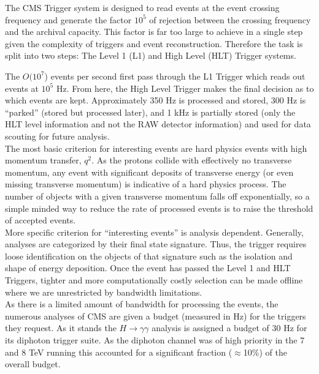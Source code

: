 The CMS Trigger system is designed to read events at the event crossing frequency and generate the
 factor $10^5$ of rejection between the crossing frequency and the archival capacity. This factor 
is far too large to achieve in a single step given the complexity of triggers and event reconstruction. 
Therefore the task is split into two steps: The Level 1 (L1) and High Level (HLT) Trigger systems.

The $O(10^7$) events per second first pass through the L1 Trigger which reads out events at $10^5$ Hz. 
From here, the High Level Trigger makes the final decision as to which events are kept. 
Approximately 350 Hz is processed and stored, 300 Hz is ``parked'' (stored but processed later), 
and 1 kHz is partially stored (only the HLT level information and not the RAW detector information) 
and used for data scouting for future analysis.  \\

The most basic criterion for interesting events are hard physics events with high momentum transfer, $q^2$.
 As the protons collide with effectively no transverse momentum, any event with significant deposits of 
transverse energy (or even missing transverse momentum) is indicative of a hard physics process. 
The number of objects with a given transverse momentum falls off exponentially, so a simple minded way to
  reduce the rate of processed events is to raise the threshold of accepted events. \\

More specific criterion for ``interesting events'' is analysis dependent. Generally, analyses are
 categorized by their final state signature. Thus, the trigger requires loose identification 
on the objects of that signature such as the isolation and shape of energy deposition. 
Once the event has passed the Level 1 and HLT Triggers, tighter and more computationally 
costly selection can be made offline where we are unrestricted by bandwidth limitations. \\

As there is a limited amount of bandwidth for processing the events, the numerous analyses of CMS
 are given a budget (measured in Hz) for the triggers they request. As it stands the $H\rightarrow \gamma\gamma$ 
analysis is assigned a budget of 30 Hz for its diphoton trigger suite. As the diphoton channel was of 
high priority in the 7 and 8 TeV running this accounted for a significant fraction ($\approx$10\%) of the overall budget. \\

